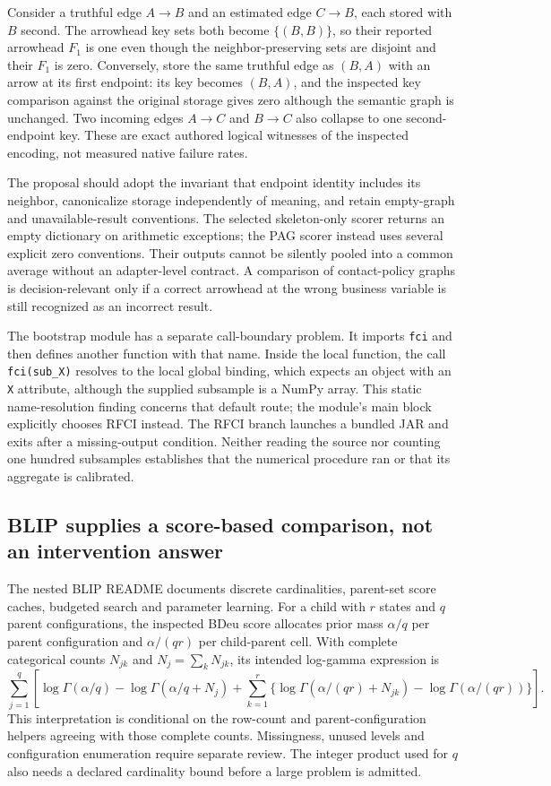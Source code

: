 Consider a truthful edge $A\to B$ and an estimated edge $C\to B$, each stored
with $B$ second. The arrowhead key sets both become $\{(B,B)\}$, so their
reported arrowhead $F_1$ is one even though the neighbor-preserving sets are
disjoint and their $F_1$ is zero. Conversely, store the same truthful edge as
$(B,A)$ with an arrow at its first endpoint: its key becomes $(B,A)$, and
the inspected key comparison against the original storage gives zero although
the semantic graph is unchanged. Two incoming edges $A\to C$ and $B\to C$
also collapse to one second-endpoint key. These are exact authored logical
witnesses of the inspected encoding, not measured native failure rates.
\citep{exec28_nested_reference}

The proposal should adopt the invariant that endpoint identity includes its
neighbor, canonicalize storage independently of meaning, and retain empty-graph
and unavailable-result conventions. The selected skeleton-only scorer returns
an empty dictionary on arithmetic exceptions; the PAG scorer instead uses
several explicit zero conventions. Their outputs cannot be silently pooled
into a common average without an adapter-level contract. A comparison of
contact-policy graphs is decision-relevant only if a correct arrowhead at the
wrong business variable is still recognized as an incorrect result.
\citep{exec28_nested_sources}

The bootstrap module has a separate call-boundary problem. It imports
\texttt{fci} and then defines another function with that name. Inside the local
function, the call \texttt{fci(sub\_X)} resolves to the local global binding,
which expects an object with an \texttt{X} attribute, although the supplied
subsample is a NumPy array. This static name-resolution finding concerns that
default route; the module's main block explicitly chooses RFCI instead. The
RFCI branch launches a bundled JAR and exits after a missing-output condition.
Neither reading the source nor counting one hundred subsamples establishes
that the numerical procedure ran or that its aggregate is calibrated.
\citep{exec28_nested_sources}

\subsection{BLIP supplies a score-based comparison, not an intervention answer}
The nested BLIP README documents discrete cardinalities, parent-set score
caches, budgeted search and parameter learning. For a child with $r$ states
and $q$ parent configurations, the inspected BDeu score allocates prior mass
$\alpha/q$ per parent configuration and $\alpha/(qr)$ per child-parent cell.
With complete categorical counts $N_{jk}$ and $N_j=\sum_kN_{jk}$, its intended
log-gamma expression is
\[
 \sum_{j=1}^{q}\left[\log\Gamma(\alpha/q)-\log\Gamma(\alpha/q+N_j)
 +\sum_{k=1}^{r}\{\log\Gamma(\alpha/(qr)+N_{jk})-\log\Gamma(\alpha/(qr))\}\right].
\]
This interpretation is conditional on the row-count and parent-configuration
helpers agreeing with those complete counts. Missingness, unused levels and
configuration enumeration require separate review. The integer product used
for $q$ also needs a declared cardinality bound before a large problem is
admitted.~\citep{exec28_nested_sources}

